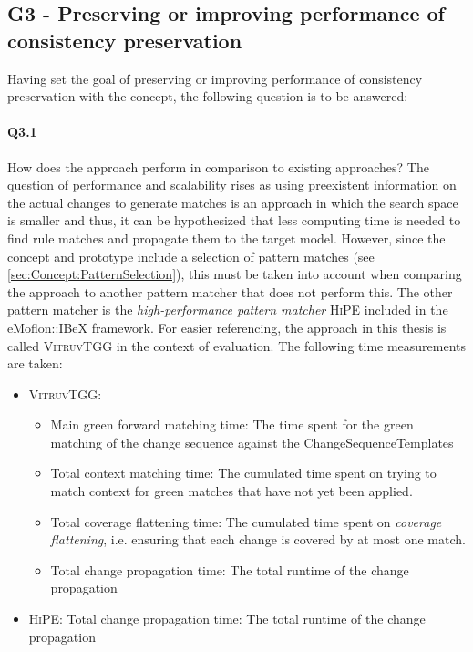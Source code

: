 \subsection{G3 - Preserving or improving performance of consistency preservation}
\label{sec:Evaluation:Design:G3}
Having set the goal of preserving or improving performance of consistency preservation with the concept, the following question is to be answered:

\paragraph{Q3.1} How does the approach perform in comparison to existing approaches? \newline
The question of performance and scalability rises as using preexistent information on the actual changes to generate matches is an approach in which the search space is smaller and thus, it can be hypothesized that less computing time is needed to find rule matches and propagate them to the target model.
However, since the concept and prototype include a selection of pattern matches (see \autoref{sec:Concept:PatternSelection}), this must be taken into account when comparing the approach to another pattern matcher that does not perform this.
The other pattern matcher is the \emph{high-performance pattern matcher} \textsc{HiPE} \cite{hipe-devops_highly_2022} included in the eMoflon::IBeX framework.
For easier referencing, the approach in this thesis is called \textsc{VitruvTGG} in the context of evaluation.
The following time measurements are taken:
\begin{itemize}
    \item \textsc{VitruvTGG}: 
        \begin{itemize}
            \item Main green forward matching time: The time spent for the green matching of the change sequence against the ChangeSequenceTemplates
            \item Total context matching time: The cumulated time spent on trying to match context for green matches that have not yet been applied.
            \item Total coverage flattening time: The cumulated time spent on \emph{coverage flattening}, i.e. ensuring that each change is covered by at most one match.
            \item Total change propagation time: The total runtime of the change propagation
        \end{itemize}
    \item \textsc{HiPE}: Total change propagation time: The total runtime of the change propagation
\end{itemize}

